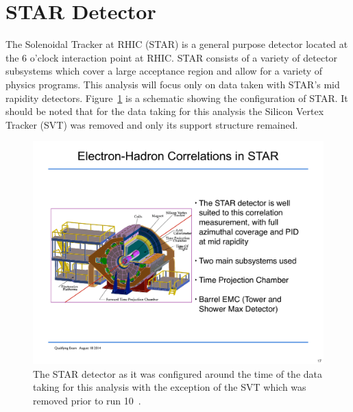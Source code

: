 \section{STAR Detector}

The Solenoidal Tracker at RHIC (STAR) is a general purpose detector located at the 6 o'clock interaction point at RHIC. STAR consists of a variety of detector subsystems which cover a large acceptance region and allow for a variety of physics programs. This analysis will focus only on data taken with STAR's mid rapidity detectors. Figure~\ref{fig:STAR} is a schematic showing the configuration of STAR. It should be noted that for the data taking for this analysis the Silicon Vertex Tracker (SVT) was removed and only its support structure remained.

\begin{figure}[htbp]
\begin{center}
\includegraphics[scale=0.7]{Plots/Detector/STAR_Detector.pdf}
\end{center}
\caption[STAR Detector]{The STAR detector as it was configured around the time of the data taking for this analysis with the exception of the SVT which was removed prior to run 10~\cite{STARweb}.}
\label{fig:STAR}
\end{figure}

